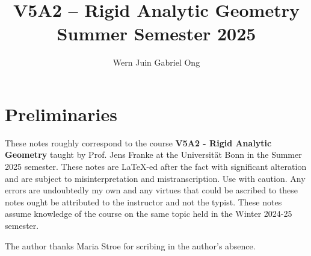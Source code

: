 \documentclass{amsart}
\theoremstyle{definition}
\numberwithin{equation}{section}
\begin{document}
\large
\title[Rigid Analytic Geometry -- Bonn, Summer 2025]{V5A2 -- Rigid Analytic Geometry \\ Summer Semester 2025}
\author{Wern Juin Gabriel Ong}
\address{Universit\"{a}t Bonn, Bonn, D-53113}
\maketitle
\section*{Preliminaries}
These notes roughly correspond to the course \textbf{V5A2 - Rigid Analytic Geometry} taught by Prof. Jens Franke at the Universit\"{a}t Bonn in the Summer 2025 semester. These notes are \LaTeX-ed after the fact with significant alteration and are subject to misinterpretation and mistranscription. Use with caution. Any errors are undoubtedly my own and any virtues that could be ascribed to these notes ought be attributed to the instructor and not the typist. These notes assume knowledge of the course on the same topic held in the Winter 2024-25 semester. 

The author thanks Maria Stroe for scribing in the author's absence. 
\tableofcontents


\newpage
\printbibliography
\end{document}
